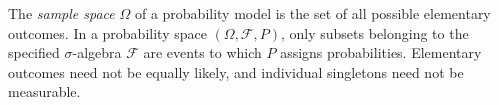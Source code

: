 
The \emph{sample space} $\Omega$ of a probability model is the set of all possible elementary outcomes. In a probability space $(\Omega,\mathcal F,P)$, only subsets belonging to the specified $\sigma$-algebra $\mathcal F$ are events to which $P$ assigns probabilities. Elementary outcomes need not be equally likely, and individual singletons need not be measurable.
